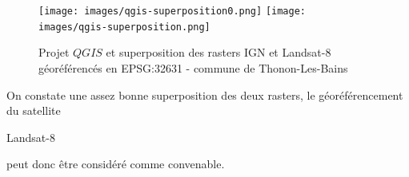 \documentclass{book}
\begin{document}
\begin{figure}[H]
\begin{center}
\texttt{[image: images/qgis-superposition0.png]}
\texttt{[image: images/qgis-superposition.png]}
\end{center}
\caption{Projet $QGIS$ et superposition des rasters IGN et Landsat-8 géoréférencés en EPSG:32631 - commune de Thonon-Les-Bains}
\label{qgis_super}
\end{figure}

\clearpage

On constate une assez bonne superposition des deux rasters, le géoréférencement du satellite \begin{itshape}Landsat-8\end{itshape} peut
 donc \^{e}tre considéré comme convenable.

\backmatter

\listoftables

\listoffigures



\end{document}
